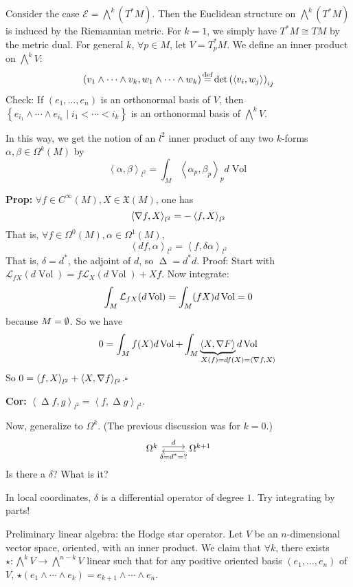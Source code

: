 \documentclass[10pt,letterpaper]{article}
\newcommand{\n}{\hfill\break}
\newcommand{\nn}{\vspace{0.5\baselineskip}\n}
\newcommand{\hangblock}[2]{\par\noindent\settowidth{\hangindent}{\textbf{#1: }}\textbf{#1: }\nolinebreak#2}
\newcommand{\cor}[1]{\hangblock{Cor}{#1}}
\newcommand{\prop}[1]{\hangblock{Prop}{#1}}
\newcommand{\proven}{\;$\square$\n}
\newcommand{\ptxt}[1]{\textrm{\textnormal{#1}}}
\newcommand{\set}[1]{\left\{#1\right\}}
\let\d\relax
\newcommand{\d}{\partial}
\DeclareMathOperator{\Vol}{Vol}
\DeclareMathOperator{\Laplacian}{\Delta}
\newcommand{\iprod}[1]{\left<#1\right>}
\newcommand{\del}{\nabla}
\let\div\relax
\DeclareMathOperator{\div}{div}
\newcommand{\labeledeq}[1]{\overset{\mathclap{\ptxt{#1}}}{=}}
\newcommand{\eqdef}{\labeledeq{def}}
\newcommand{\paren}[1]{\left(#1\right)}
\let\i\relax
\newcommand{\i}[1]{\textit{#1}}
\newcommand{\mf}[1]{\mathfrak{#1}}
\newcommand{\mc}[1]{\mathcal{#1}}
\begin{document}
\par\noindent
Consider the case $\mc{E}=\bigwedge^{k}(T^{*}M)$. Then the Euclidean structure on $\bigwedge^{k}(T^{*}M)$ is induced by the Riemannian metric. For $k=1$, we simply have $T^{*}M\cong{}TM$ by the metric dual. For general $k$, $\forall{}p\in{}M$, let $V=T_{p}^{*}M$. We define an inner product on $\bigwedge^{k}V$:
\[
	(v_{1}\wedge\cdots\wedge{}v_{k},w_{1}\wedge\cdots\wedge{}w_{k})\eqdef\det\paren{\iprod{v_{i},w_{j}}}_{ij}
\]
Check: If $(e_{1},\ldots,e_{n})$ is an orthonormal basis of $V$, then $\set{e_{i_{1}}\wedge\cdots\wedge{}e_{i_{k}}\mid{}i_{1}<\cdots<i_{k}}$ is an orthonormal basis of $\bigwedge^{k}V$.\n

\par\noindent
In this way, we get the notion of an $l^{2}$ inner product of any two $k$-forms $\alpha,\beta\in\Omega^{k}(M)$ by
\[
	\iprod{\alpha,\beta}_{l^{2}}=\int_{M}\iprod{\alpha_{p},\beta_{p}}_{p}d\Vol
\]

\prop{
	$\forall{}f\in{}C^{\infty}(M),X\in\mf{X}(M)$, one has
	\[
		\iprod{\del{}f,X}_{l^{2}}=-\iprod{f,\div{}X}_{l^{2}}
	\]
	That is, $\forall{}f\in\Omega^{0}(M),\alpha\in\Omega^{1}(M)$,
	\[
		\iprod{df,\alpha}_{l^{2}}=\iprod{f,\delta\alpha}_{l^{2}}
	\]
	That is, $\delta=d^{*}$, the adjoint of $d$, so $\Laplacian=d^{*}d$.\nn
	Proof: Start with $\mc{L}_{fX}(d\Vol)=f\mc{L}_{X}(d\Vol)+Xf$. Now integrate:
	\[
		\int_{M}\mc{L}_{fX}(d\Vol)=\int_{M}\div(fX)d\Vol=0
	\]
	because $\d{}M=\emptyset$. So we have
	\[
		0=\int_{M}f\div(X)d\Vol+\int_{M}\underbrace{\iprod{X,\del{}F}}_{\hspace{-35pt}\mathrlap{X(f)=df(X)=\iprod{\del{}f,X}}}d\Vol
	\]
	So $0=\iprod{f,\div{}X}_{l^{2}}+\iprod{X,\del{}f}_{l^{2}}$.\proven
}

\cor{
	$\iprod{\Laplacian{}f,g}_{l^{2}}=\iprod{f,\Laplacian{}g}_{l^{2}}$.\n
}

\par\noindent
Now, generalize to $\Omega^{k}$. (The previous discussion was for $k=0$.)
\[
	\begin{tikzcd}
		\Omega^{k} \arrow[r, shift left, "d"] & \Omega^{k+1} \arrow[l, shift left, "\delta=d^{*}=?"]
	\end{tikzcd}
\]
Is there a $\delta$? What is it?\n

\par\noindent
In local coordinates, $\delta$ is \i{also} a differential operator of degree $1$. Try integrating by parts!\n

\par\noindent
Preliminary linear algebra: the Hodge star operator. Let $V$ be an $n$-dimensional vector space, oriented, with an inner product. We claim that $\forall{}k$, there exists $\star:\bigwedge^{k}V\to\bigwedge^{n-k}V$ linear such that for any positive oriented basis $(e_{1},\ldots,e_{n})$ of $V$, $\star(e_{1}\wedge\cdots\wedge{}e_{k})=e_{k+1}\wedge\cdots\wedge{}e_{n}$.\n
\end{document}
